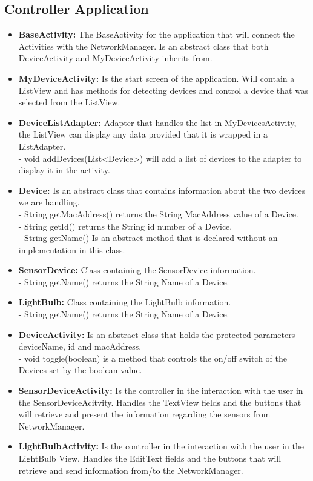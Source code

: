 \documentclass[a4paper]{article}
\begin{document}
	\subsection{Controller Application}
	\begin{itemize}
		\item{\textbf{BaseActivity:}} 
		The BaseActivity for the application that will connect the Activities with the NetworkManager. Is an abstract class that both DeviceActivity and MyDeviceActivity inherits from.
		\item{\textbf{MyDeviceActivity:}} 
		Is the start screen of the application. Will contain a ListView and has methods for detecting devices and control a device that was selected from the ListView.
		\item{\textbf{DeviceListAdapter:}} 
		Adapter that handles the list in MyDevicesActivity, the ListView can display any data provided that it is wrapped in a ListAdapter.\\ 
        - void addDevices(List<Device>) will add a list of devices to the adapter to display it in the activity.
		\item{\textbf{Device:}} 
		Is an abstract class that contains information about the two devices we are handling. \\
        - String getMacAddress() returns the String MacAddress value of a Device.\\
        - String getId() returns the String id number of a Device.\\
        - String getName() Is an abstract method that is declared without an implementation in this class.
		\item{\textbf{SensorDevice:}} 
		Class containing the SensorDevice information.\\
        - String getName() returns the String Name of a Device.
		\item{\textbf{LightBulb:}}
		Class containing the LightBulb information.\\
        - String getName() returns the String Name of a Device.
		\item{\textbf{DeviceActivity:}} 
		Is an abstract class that holds the protected parameters deviceName, id and macAddress.\\
		- void toggle(boolean) is a method that controls the on/off switch of the Devices set by the boolean value.
		\item{\textbf{SensorDeviceActivity:}} 
		Is the controller in the interaction with the user in the SensorDeviceAcitvity. Handles the TextView fields and the buttons that will retrieve and present the information regarding the sensors from NetworkManager.
		\item{\textbf{LightBulbActivity:}} 
		Is the controller in the interaction with the user in the LightBulb View. Handles the EditText fields and the buttons that will retrieve and send information from/to the NetworkManager.
		

\end{itemize}
\end{document}
